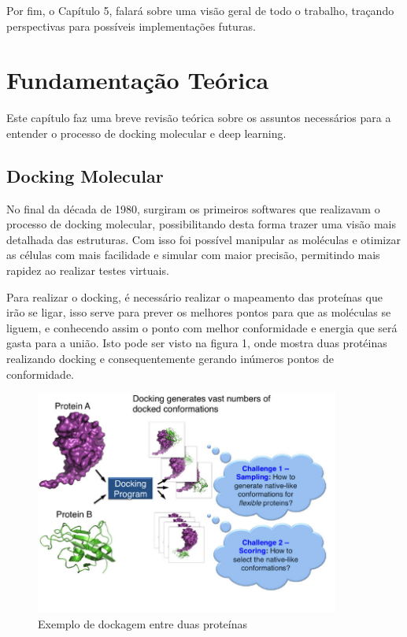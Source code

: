 \documentclass[tcc, capa]{texucpel}
\begin{document}
Por fim, o Capítulo 5, falará sobre uma visão geral de todo o trabalho, traçando perspectivas para possíveis implementações futuras.

\chapter{Fundamentação Teórica}
Este capítulo faz uma breve revisão teórica sobre os assuntos necessários para a entender o processo de docking molecular  e deep learning.

\section{Docking Molecular}
No final da década de 1980, surgiram os primeiros softwares que realizavam o processo de docking molecular, possibilitando desta forma trazer uma visão mais detalhada das estruturas. Com isso foi possível manipular as moléculas e otimizar as células com mais facilidade e simular com maior precisão, permitindo mais rapidez ao realizar testes virtuais.

Para realizar o docking, é necessário realizar o mapeamento das proteínas que irão se ligar, isso serve para prever os melhores pontos para que as moléculas se liguem, e conhecendo assim o ponto com melhor conformidade e energia que será gasta para a união. Isto pode ser visto na figura 1, onde mostra duas protéinas realizando  docking e consequentemente gerando inúmeros pontos de conformidade.

      \begin{figure}[!htb]
	\centering
 \cite{xue2015protein}
    \caption{Exemplo de dockagem entre duas proteínas}
    \includegraphics[width=10cm]{imagens/mostra_docking.png}
	\end{figure}
    
\end{document}
